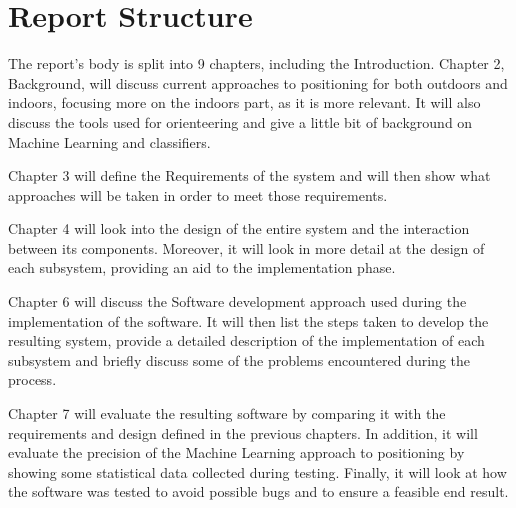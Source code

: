 \documentclass[12pt]{informatics-report}
\begin{document}
\section{Report Structure}
The report's body is split into 9 chapters, including the Introduction.
Chapter 2, Background, will discuss current approaches to positioning for both outdoors and indoors, focusing more on the indoors part, as it is more relevant. It will also discuss the tools used for orienteering and give a little bit of background on Machine Learning and classifiers. 

Chapter 3 will define the Requirements of the system and will then show what approaches will be taken in order to meet those requirements.

Chapter 4 will look into the design of the entire system and the interaction between its components. Moreover, it will look in more detail at the design of each subsystem, providing an aid to the implementation phase.

Chapter 6 will discuss the Software development approach used during the implementation of the software. It will then list the steps taken to develop the resulting system, provide a detailed description of the implementation of each subsystem and briefly discuss some of the problems encountered during the process.

Chapter 7 will evaluate the resulting software by comparing it with the requirements and design defined in the previous chapters. In addition, it will evaluate the precision of the Machine Learning approach to positioning by showing some statistical data collected during testing. Finally, it will look at how the software was tested to avoid possible bugs and to ensure a feasible end result.
 











\end{document}
